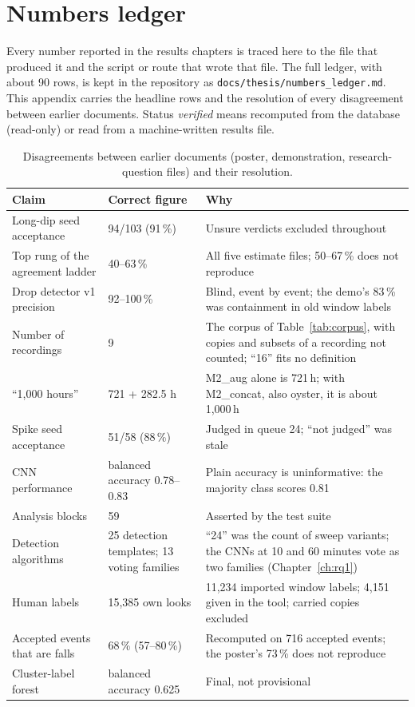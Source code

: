 \chapter{Numbers ledger}
\label{app:ledger}

Every number reported in the results chapters is traced here to the file that produced it and the script or route that wrote that file. The full ledger, with about 90 rows, is kept in the repository as \texttt{docs/thesis/numbers\_ledger.md}. This appendix carries the headline rows and the resolution of every disagreement between earlier documents. Status \emph{verified} means recomputed from the database (read-only) or read from a machine-written results file.

\begin{table}[htbp]
\caption[{Disagreements between earlier documents.}]{Disagreements between earlier documents (poster, demonstration, research-question files) and their resolution.}
\label{tab:ledgerfix}
\footnotesize
\begin{tabularx}{\textwidth}{p{4.2cm} p{2.6cm} X}
\toprule
\textbf{Claim} & \textbf{Correct figure} & \textbf{Why}\\
\midrule
Long-dip seed acceptance & 94/103 (91\,\%) & Unsure verdicts excluded throughout\\
Top rung of the agreement ladder & 40--63\,\% & All five estimate files; 50--67\,\% does not reproduce\\
Drop detector v1 precision & 92--100\,\% & Blind, event by event; the demo's 83\,\% was containment in old window labels\\
Number of recordings & 9 & The corpus of Table~\ref{tab:corpus}, with copies and subsets of a recording not counted; ``16'' fits no definition\\
``1,000 hours'' & 721 + 282.5 h & M2\_aug alone is 721\,h; with M2\_concat, also oyster, it is about 1,000\,h\\
Spike seed acceptance & 51/58 (88\,\%) & Judged in queue 24; ``not judged'' was stale\\
CNN performance & balanced accuracy 0.78--0.83 & Plain accuracy is uninformative: the majority class scores 0.81\\
Analysis blocks & 59 & Asserted by the test suite\\
Detection algorithms & 25 detection templates; 13 voting families & ``24'' was the count of sweep variants; the CNNs at 10 and 60 minutes vote as two families (Chapter~\ref{ch:rq1})\\
Human labels & 15,385 own looks & 11,234 imported window labels; 4,151 given in the tool; carried copies excluded\\
Accepted events that are falls & 68\,\% (57--80\,\%) & Recomputed on 716 accepted events; the poster's 73\,\% does not reproduce\\
Cluster-label forest & balanced accuracy 0.625 & Final, not provisional\\
\bottomrule
\end{tabularx}
\end{table}

